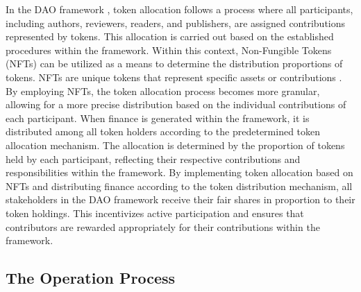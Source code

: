 \documentclass[lettersize,journal]{IEEEtran}
\begin{document}
In the DAO framework \cite{hsieh2018bitcoin}, token allocation follows a process where all participants, including authors, reviewers, readers, and publishers, are assigned contributions represented by tokens. This allocation is carried out based on the established procedures within the framework.
Within this context, Non-Fungible Tokens (NFTs) can be utilized as a means to determine the distribution proportions of tokens. NFTs are unique tokens that represent specific assets or contributions \cite{10034436}. By employing NFTs, the token allocation process becomes more granular, allowing for a more precise distribution based on the individual contributions of each participant.
When finance is generated within the framework, it is distributed among all token holders according to the predetermined token allocation mechanism. The allocation is determined by the proportion of tokens held by each participant, reflecting their respective contributions and responsibilities within the framework.
By implementing token allocation based on NFTs and distributing finance according to the token distribution mechanism, all stakeholders in the DAO framework receive their fair shares in proportion to their token holdings. This incentivizes active participation and ensures that contributors are rewarded appropriately for their contributions within the framework.


\subsection{The Operation Process}
\end{document}
